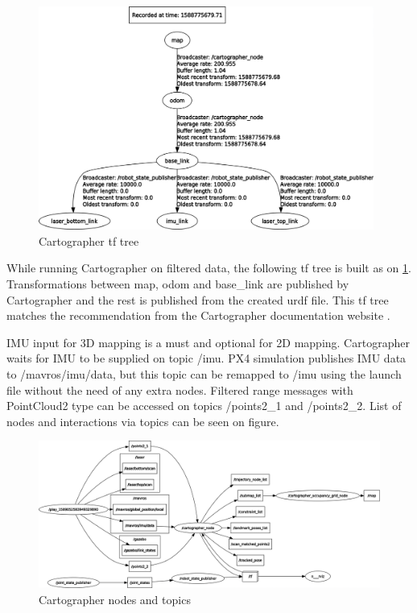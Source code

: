 \begin{figure}[!ht]
    \centering
    \includegraphics[width=110mm, keepaspectratio]{figures/cartographer_tf_tree.png}
    \caption{Cartographer tf tree}
    \label{fig:cartographer_tf_tree}
\end{figure}


While running Cartographer on filtered data, the following tf tree is built as on \ref{fig:cartographer_tf_tree}.
Transformations between map, odom and base\_link are published by Cartographer and the rest is published 
from the created urdf file. This tf tree matches the recommendation from the Cartographer documentation
website \cite{CartographerDocumentation}.

IMU input for 3D mapping is a must and optional for 2D mapping. Cartographer waits for IMU to be supplied 
on topic /imu. PX4 simulation publishes IMU data to /mavros/imu/data, but this topic can be remapped to /imu
using the launch file without the need of any extra nodes. Filtered range messages with PointCloud2 type 
can be accessed on topics /points2\_1 and /points2\_2. List of nodes and interactions via topics can be 
seen on figure.

\begin{figure}[!ht]
    \centering
    \includegraphics[width=140mm, keepaspectratio]{figures/cartographer_nodes.png}
    \caption{Cartographer nodes and topics}
    \label{fig:cartographer_nodes}
\end{figure}

